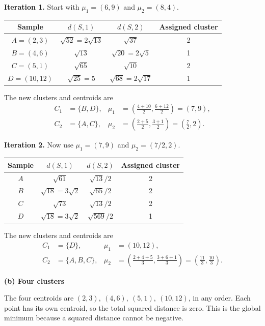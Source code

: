 \documentclass[11pt]{article}
\newcommand{\parttitle}[1]{\par\textbf{#1}\par}
\begin{document}
\textbf{Iteration 1.} Start with $\mu_1=(6,9)$ and $\mu_2=(8,4)$.
\begin{center}
\begin{tabular}{cccc}
\toprule
Sample & $d(S,1)$ & $d(S,2)$ & Assigned cluster \\
\midrule
$A=(2,3)$ & $\sqrt{52}=2\sqrt{13}$ & $\sqrt{37}$ & 2 \\
$B=(4,6)$ & $\sqrt{13}$ & $\sqrt{20}=2\sqrt{5}$ & 1 \\
$C=(5,1)$ & $\sqrt{65}$ & $\sqrt{10}$ & 2 \\
$D=(10,12)$ & $\sqrt{25}=5$ & $\sqrt{68}=2\sqrt{17}$ & 1 \\
\bottomrule
\end{tabular}
\end{center}
The new clusters and centroids are
\begin{align*}
 C_1&=\{B,D\}, & \mu_1&=\left(\frac{4+10}{2},\frac{6+12}{2}\right)=(7,9),\\
 C_2&=\{A,C\}, & \mu_2&=\left(\frac{2+5}{2},\frac{3+1}{2}\right)=\left(\frac72,2\right).
\end{align*}

\textbf{Iteration 2.} Now use $\mu_1=(7,9)$ and $\mu_2=(7/2,2)$.
\begin{center}
\begin{tabular}{cccc}
\toprule
Sample & $d(S,1)$ & $d(S,2)$ & Assigned cluster \\
\midrule
$A$ & $\sqrt{61}$ & $\sqrt{13}/2$ & 2 \\
$B$ & $\sqrt{18}=3\sqrt{2}$ & $\sqrt{65}/2$ & 2 \\
$C$ & $\sqrt{73}$ & $\sqrt{13}/2$ & 2 \\
$D$ & $\sqrt{18}=3\sqrt{2}$ & $\sqrt{569}/2$ & 1 \\
\bottomrule
\end{tabular}
\end{center}
The new clusters and centroids are
\begin{align*}
 C_1&=\{D\}, & \mu_1&=(10,12),\\
 C_2&=\{A,B,C\}, & \mu_2&=\left(\frac{2+4+5}{3},\frac{3+6+1}{3}\right)
 =\left(\frac{11}{3},\frac{10}{3}\right).
\end{align*}

\parttitle{(b) Four clusters}
The four centroids are $\boxed{(2,3),\ (4,6),\ (5,1),\ (10,12)}$, in any order.
Each point has its own centroid, so the total squared distance is zero. This is the global minimum because a squared distance cannot be negative.

\newpage
\end{document}
